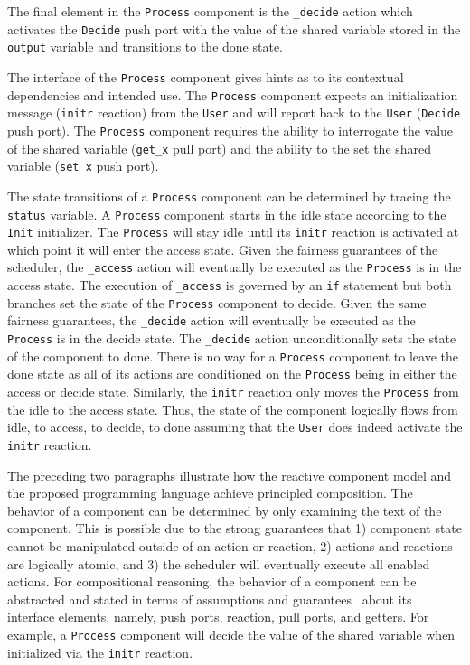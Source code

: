 The final element in the \verb+Process+ component is the \verb+_decide+ action which activates the \verb+Decide+ push port with the value of the shared variable stored in the \verb+output+ variable and transitions to the done state.

The interface of the \verb+Process+ component gives hints as to its contextual dependencies and intended use.
The \verb+Process+ component expects an initialization message (\verb+initr+ reaction) from the \verb+User+ and will report back to the \verb+User+ (\verb+Decide+ push port).
The \verb+Process+ component requires the ability to interrogate the value of the shared variable (\verb+get_x+ pull port) and the ability to the set the shared variable (\verb+set_x+ push port).

The state transitions of a \verb+Process+ component can be determined by tracing the \verb+status+ variable.
A \verb+Process+ component starts in the idle state according to the \verb+Init+ initializer.
The \verb+Process+ will stay idle until its \verb+initr+ reaction is activated at which point it will enter the access state.
Given the fairness guarantees of the scheduler, the \verb+_access+ action will eventually be executed as the \verb+Process+ is in the access state.
The execution of \verb+_access+ is governed by an \verb+if+ statement but both branches set the state of the \verb+Process+ component to decide.
Given the same fairness guarantees, the \verb+_decide+ action will eventually be executed as the \verb+Process+ is in the decide state.
The \verb+_decide+ action unconditionally sets the state of the component to done.
There is no way for a \verb+Process+ component to leave the done state as all of its actions are conditioned on the \verb+Process+ being in either the access or decide state.
Similarly, the \verb+initr+ reaction only moves the \verb+Process+ from the idle to the access state.
Thus, the state of the component logically flows from idle, to access, to decide, to done assuming that the \verb+User+ does indeed activate the \verb+initr+ reaction.

The preceding two paragraphs illustrate how the reactive component model and the proposed programming language achieve principled composition.
The behavior of a component can be determined by only examining the text of the component.
This is possible due to the strong guarantees that 1) component state cannot be manipulated outside of an action or reaction, 2) actions and reactions are logically atomic, and 3) the scheduler will eventually execute all enabled actions.
For compositional reasoning, the behavior of a component can be abstracted and stated in terms of assumptions and guarantees~\cite{Jones:1983:TST:69575.69577} about its interface elements, namely, push ports, reaction, pull ports, and getters.
For example, a \verb+Process+ component will decide the value of the shared variable when initialized via the \verb+initr+ reaction.

